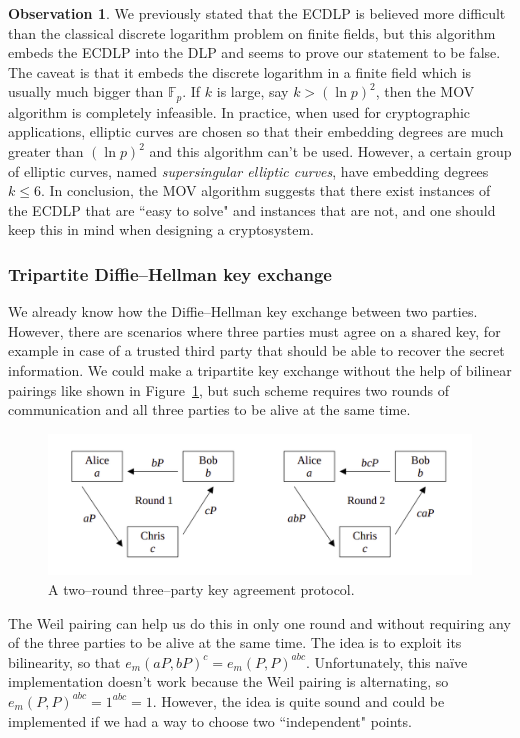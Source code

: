 \documentclass[9pt]{article}
\theoremstyle{definition}
\newtheorem*{observation}{Observation}
\begin{document}
\begin{observation}
We previously stated that the ECDLP is believed more difficult than the classical discrete logarithm problem on finite fields, but this algorithm embeds the ECDLP into the DLP and seems to prove our statement to be false. The caveat is that it embeds the discrete logarithm in a finite field which is usually much bigger than $\mathbb{F}_p$. If $k$ is large, say $k > (\ln p)^2$, then the MOV algorithm is completely infeasible. In practice, when used for cryptographic applications, elliptic curves are chosen so that their embedding degrees are much greater than $(\ln p)^2$ and this algorithm can't be used. However, a certain group of elliptic curves, named \textit{supersingular elliptic curves}, have embedding degrees $k \leq 6$. In conclusion, the MOV algorithm suggests that there exist instances of the ECDLP that are ``easy to solve" and instances that are not, and one should keep this in mind when designing a cryptosystem.
\end{observation}

\subsubsection{Tripartite Diffie--Hellman key exchange}
We already know how the Diffie--Hellman key exchange between two parties. However, there are scenarios where three parties must agree on a shared key, for example in case of a trusted third party that should be able to recover the secret information. We could make a tripartite key exchange without the help of bilinear pairings like shown in Figure~\ref{fig:tdhke}, but such scheme requires two rounds of communication and all three parties to be alive at the same time.

\begin{figure}[h]
	\centering
	\includegraphics[width=.9\textwidth]{tdhke.png}
	\caption{A two--round three--party key agreement protocol.}
	\label{fig:tdhke}
\end{figure}

The Weil pairing can help us do this in only one round and without requiring any of the three parties to be alive at the same time. The idea is to exploit its bilinearity, so that $e_m(aP, bP)^c = e_m(P, P)^{abc}$. Unfortunately, this na\"{i}ve implementation doesn't work because the Weil pairing is alternating, so $e_m(P, P)^{abc} = 1^{abc} = 1$. However, the idea is quite sound and could be implemented if we had a way to choose two ``independent" points.
\end{document}
